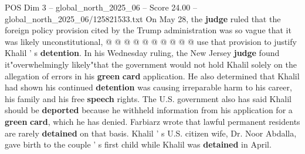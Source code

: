 \begin{textsample}{POS Dim 3 – global\_north\_2025\_06 – Score 24.00 – global\_north\_2025\_06/125821533.txt}
On May 28, the \textbf{judge} ruled that the foreign policy provision cited by the Trump administration was so vague that it was likely unconstitutional, @ @ @ @ @ @ @ @ @ @ use that provision to justify Khalil ' s \textbf{detention}.
In his Wednesday ruling, the New Jersey \textbf{judge} found it"overwhelmingly likely"that the government would not hold Khalil solely on the allegation of errors in his \textbf{green} \textbf{card} application.
He also determined that Khalil had shown his continued \textbf{detention} was causing irreparable harm to his career, his family and his free \textbf{speech} rights.
The U.S. government also has said Khalil should be \textbf{deported} because he withheld information from his application for a \textbf{green} \textbf{card}, which he has denied.
Farbiarz wrote that lawful permanent residents are rarely \textbf{detained} on that basis.
Khalil ' s U.S. citizen wife, Dr.
Noor Abdalla, gave birth to the couple ' s first child while Khalil was \textbf{detained} in April.

\end{textsample}
